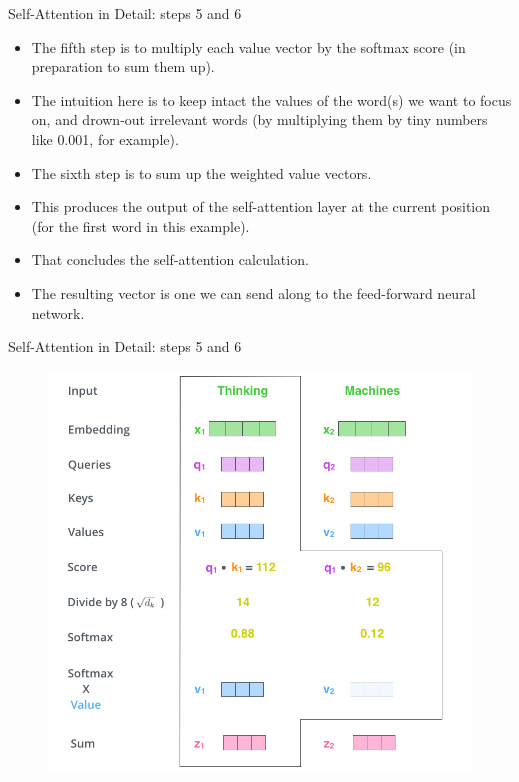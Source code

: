 \documentclass[handout]{beamer}
\begin{document}
\begin{frame}{Self-Attention in Detail: steps 5 and 6}
\begin{scriptsize}
\begin{itemize}


\item The fifth step is to multiply each value vector by the softmax score (in preparation to sum them up). 

\item The intuition here is to keep intact the values of the word(s) we want to focus on, and drown-out irrelevant words (by multiplying them by tiny numbers like 0.001, for example).

\item The sixth step is to sum up the weighted value vectors. 

\item This produces the output of the self-attention layer at the current position (for the first word in this example).

\item That concludes the self-attention calculation. 

\item The resulting vector is one we can send along to the feed-forward neural network.


\end{itemize}

\end{scriptsize}


\end{frame}

\begin{frame}{Self-Attention in Detail: steps 5 and 6}


\begin{figure}[h]
        	\includegraphics[scale = 0.3]{pics/self-attention-output.png}
        \end{figure} 


\end{frame}
\end{document}
